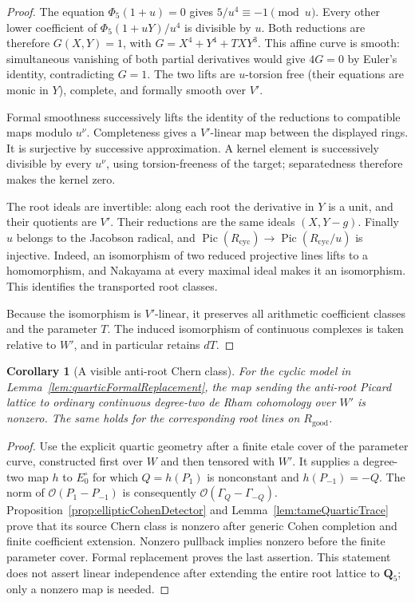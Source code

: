 \documentclass[11pt,a4paper]{article}
\newtheorem{corollary}[theorem]{Corollary}
\theoremstyle{remark}
\begin{document}
\begin{proof}
The equation $\Phi_5(1+u)=0$ gives $5/u^4\equiv-1\pmod u$.
Every other lower coefficient of $\Phi_5(1+uY)/u^4$ is divisible by
$u$.  Both reductions are therefore $G(X,Y)=1$, with
$G=X^4+Y^4+TXY^3$.  This affine curve is smooth: simultaneous
vanishing of both partial derivatives would give $4G=0$ by Euler's
identity, contradicting $G=1$.  The two lifts are $u$-torsion free
(their equations are monic in $Y$), complete, and formally smooth
over $V'$.

Formal smoothness successively lifts the identity of the reductions
to compatible maps modulo $u^\nu$.  Completeness gives a $V'$-linear
map between the displayed rings.  It is surjective by successive
approximation.  A kernel element is successively divisible by every
$u^\nu$, using torsion-freeness of the target; separatedness therefore
makes the kernel zero.

The root ideals are invertible: along each root the derivative in
$Y$ is a unit, and their quotients are $V'$.  Their reductions are
the same ideals $(X,Y-g)$.  Finally $u$ belongs to the Jacobson
radical, and $\operatorname{Pic}(R_{\mathrm{cyc}})\to
\operatorname{Pic}(R_{\mathrm{cyc}}/u)$ is injective.  Indeed, an
isomorphism of two reduced projective lines lifts to a homomorphism,
and Nakayama at every maximal ideal makes it an isomorphism.  This
identifies the transported root classes.

Because the isomorphism is $V'$-linear, it preserves all arithmetic
coefficient classes and the parameter $T$.  The induced isomorphism
of continuous complexes is taken relative to $W'$, and in particular
retains $dT$.
\end{proof}

\begin{corollary}[A visible anti-root Chern class]
\label{cor:quarticRootChernDetected}
For the cyclic model in Lemma~\ref{lem:quarticFormalReplacement},
the map sending the anti-root Picard lattice to ordinary continuous
degree-two de Rham cohomology over $W'$ is nonzero.  The same holds
for the corresponding root lines on $R_{\mathrm{good}}$.
\end{corollary}

\begin{proof}
Use the explicit quartic geometry after a finite etale cover of the
parameter curve, constructed first over $W$ and then tensored with
$W'$.  It supplies a degree-two map $h$ to $E_0^\circ$ for which
$Q=h(P_1)$ is nonconstant and $h(P_{-1})=-Q$.  The norm of
$\mathcal O(P_1-P_{-1})$ is consequently
$\mathcal O(\Gamma_Q-\Gamma_{-Q})$.
Proposition~\ref{prop:ellipticCohenDetector} and
Lemma~\ref{lem:tameQuarticTrace} prove that its source Chern class is
nonzero after generic Cohen completion and finite coefficient
extension.  Nonzero pullback implies nonzero before the finite
parameter cover.  Formal replacement proves the last assertion.
This statement does not assert linear independence after extending
the entire root lattice to $\mathbf Q_5$; only a nonzero map is needed.
\end{proof}
\end{document}

